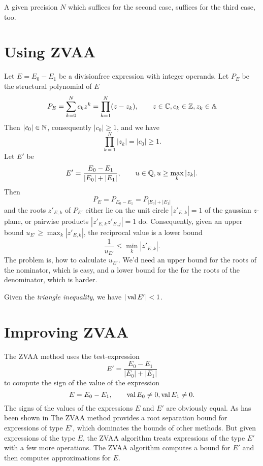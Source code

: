 A given precision $N$ which suffices for the second case,
suffices for the third case, too.




\pagebreak
\section{Using ZVAA}

Let $E=E_0-E_1$ be a divisionfree expression with integer operands.
Let $P_E$ be the structural polynomial of $E$
\begin{equation}
  P_E = \sum_{k=0}^{N} c_k z^k = \prod_{k=1}^N (z - z_k)
  ,\qquad
  z\in\mathbb{C}, c_k\in\mathbb{Z}, z_k\in\mathbb{A}
\end{equation}
Then $|c_0|\in\mathbb{N}$, consequently $|c_0|\ge 1$, and we have
\begin{equation}
  \prod_{k=1}^N |z_k| = |c_0| \ge 1.
\end{equation}
Let $E'$ be 
\begin{equation}
  E' = \frac{E_0-E_1}{|E_0|+|E_1|}
  ,\qquad
  u\in\mathbb{Q}, u\ge\max_k|z_k|.
\end{equation}
Then
\begin{equation}
  P_E=P_{E_0-E_1}=P_{|E_0|+|E_1|}
\end{equation}
and the roots $z'_{E,k}$ of $P_{E'}$ 
either lie on the unit circle $|z'_{E,k}|=1$ of the gaussian $z$-plane,
or pairwise products $|z'_{E,k}z'_{E,j}|=1$ do.
Consequently, given an upper bound $u_{E'}\ge\max_k|z'_{E,k}|$,
the reciprocal value is a lower bound
\begin{equation}
  \frac{1}{u_{E'}}\le\min_k|z'_{E,k}|.
\end{equation}
The problem is, how to calculate $u_{E'}$.
We'd need an upper bound for the roots of the nominator, which is easy,
and a lower bound for the for the roots of the denominator, 
which is harder.

Given the {\em triangle inequality}, we have $|\mathop{\rm val}\nolimits E'|<1$.



\pagebreak
\section{Improving ZVAA}

The ZVAA method uses the test-expression
\begin{equation}
  E' = \frac{E_0 - E_1}{|E_0| + |E_1|}
\end{equation}
to compute the sign of the value of the expression
\begin{equation}
  E = E_0 - E_1
  ,\qquad
  \mathop{\rm val}\nolimits E_0\ne 0, \mathop{\rm val}\nolimits E_1\ne 0.
\end{equation}
The signs of the values of the expressions
$E$ and $E'$ are obviously equal.
As has been shown in \cite{ZVAA}
The ZVAA method provides a root separation bound
for expressions of type $E'$, 
which dominates the bounds of other methods.
But given expressions of the type $E$,
the ZVAA algorithm treats expressions of the type $E'$
with a few more operations.
The ZVAA algorithm computes a bound for $E'$
and then computes approximations for $E$.


